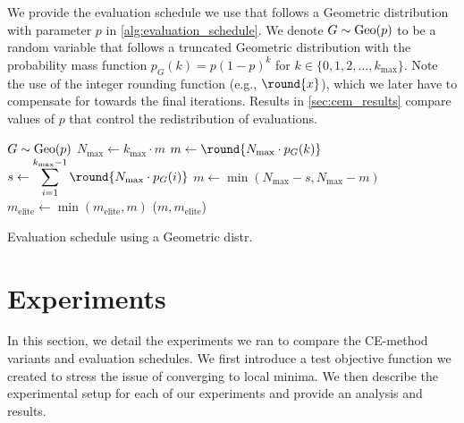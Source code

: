 We provide the evaluation schedule we use that follows a Geometric distribution with parameter $p$ in \cref{alg:evaluation_schedule}.
We denote $G \sim \operatorname{Geo}(p)$ to be a random variable that follows a truncated Geometric distribution with the probability mass function $p_G(k) = p(1 - p)^k$ for $k \in \{0, 1, 2, \ldots, k_\text{max}\}$. %
Note the use of the integer rounding function (e.g., $\round{x}$), which we later have to compensate for towards the final iterations.
Results in \cref{sec:cem_results} compare values of $p$ that control the redistribution of evaluations.


\begin{algorithm}[ht]
  \begin{algorithmic}
    \State $G \sim \operatorname{Geo}(p)$
    \State $N_\text{max} \leftarrow k_\text{max} \cdot m$
    \State $m \leftarrow \round{N_\text{max} \cdot p_G(k)}$
        \State $s \leftarrow \displaystyle\sum_{i=1}^{k_\text{max}-1} \round{N_\text{max} \cdot p_G(i)}$
        \State $m \leftarrow \min(N_\text{max} - s, N_\text{max} - m)$
    \EndIf
    \State $m_\text{elite} \leftarrow \min(m_\text{elite}, m)$
    \State \Return ($m, m_\text{elite}$) 
  \EndFunction
  \end{algorithmic}
  \caption{\label{alg:evaluation_schedule} Evaluation schedule using a Geometric distr.}
\end{algorithm}


\section{Experiments} \label{sec:cem_experiments}
In this section, we detail the experiments we ran to compare the CE-method variants and evaluation schedules.
We first introduce a test objective function we created to stress the issue of converging to local minima. 
We then describe the experimental setup for each of our experiments and provide an analysis and results.


